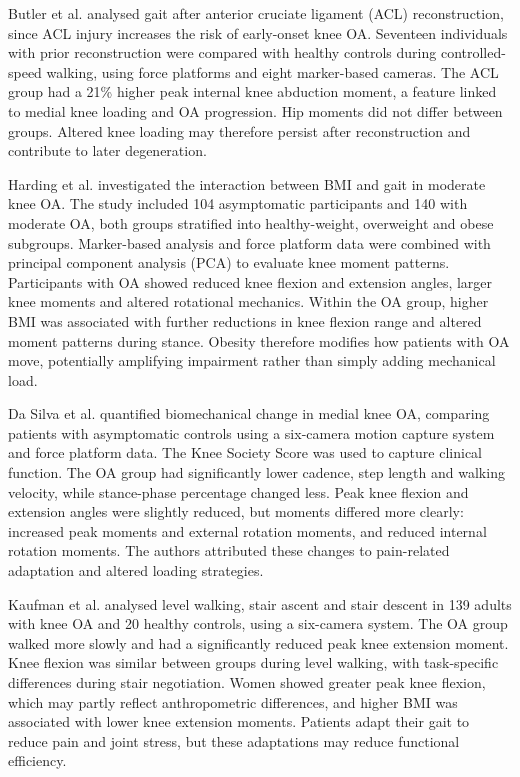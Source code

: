 \documentclass[12pt]{elsarticle}
\begin{document}
Butler et al. \cite{butler2009gait} { analysed} gait after anterior cruciate ligament (ACL) { reconstruction, since ACL injury increases} the risk of early-onset knee { OA.} Seventeen individuals with prior reconstruction were compared with healthy controls during controlled-speed { walking,} using force platforms and eight marker-based cameras. The ACL group { had} a 21\% higher peak internal knee abduction moment, a feature linked { to} medial knee loading and OA progression. { Hip moments did not differ between groups. Altered} knee loading may { therefore persist after reconstruction} and contribute to later { degeneration.}

Harding et al. \cite{harding2012body} investigated the interaction between BMI and gait in moderate knee OA. { The} study included 104 asymptomatic participants and 140 with moderate OA, both groups stratified into healthy-weight, { overweight} and obese subgroups. Marker-based analysis and force platform data were { combined} with principal component analysis { (PCA)} to evaluate knee moment patterns. { Participants} with OA showed reduced knee flexion and extension angles, larger knee moments and altered rotational mechanics. { Within} the OA group, higher BMI was associated with further reductions in knee flexion range and altered moment patterns during stance. { Obesity therefore modifies how} patients with OA move, potentially amplifying { impairment rather than simply adding mechanical load.}

Da Silva et al. \cite{da2012biomechanical} { quantified} biomechanical change in medial knee { OA, comparing patients with asymptomatic controls using} a six-camera motion capture system and force platform { data. The} Knee Society Score { was used} to capture clinical function. The OA group { had} significantly lower cadence, step { length} and walking velocity, while { stance-phase percentage changed less.} Peak knee flexion and extension angles were slightly reduced, but moments differed more clearly: increased peak { moments and} external rotation moments, and reduced internal rotation moments. The authors { attributed these changes to} pain-related adaptation and altered loading strategies.

Kaufman et al. \cite{kaufman2001gait} { analysed} level walking, stair { ascent and stair descent in} 139 adults with knee OA and 20 healthy { controls, using a six-camera system. The} OA group walked more slowly and had a significantly reduced peak knee extension moment. Knee flexion was similar between groups during level walking, { with} task-specific differences during stair negotiation. { Women} showed greater peak knee flexion, which may partly reflect anthropometric differences, and higher BMI was associated with lower knee extension moments. { Patients} adapt their gait to reduce pain and joint stress, but { these} adaptations may reduce functional efficiency.
\end{document}

